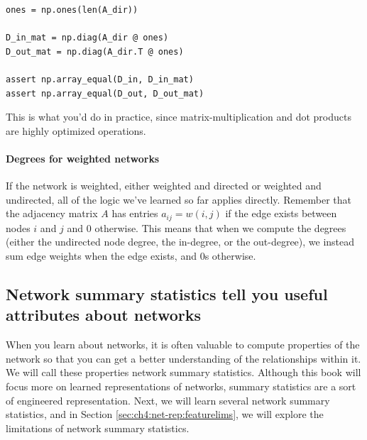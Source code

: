\begin{lstlisting}[style=python]
ones = np.ones(len(A_dir))

D_in_mat = np.diag(A_dir @ ones)
D_out_mat = np.diag(A_dir.T @ ones)

assert np.array_equal(D_in, D_in_mat)
assert np.array_equal(D_out, D_out_mat)
\end{lstlisting}

This is what you'd do in practice, since matrix-multiplication and dot products are highly optimized operations.

\paragraph{Degrees for weighted networks}

If the network is weighted, either weighted and directed or weighted and undirected, all of the logic we've learned so far applies directly. Remember that the adjacency matrix $A$ has entries $a_{ij} = w(i, j)$ if the edge exists between nodes $i$ and $j$ and $0$ otherwise. This means that when we compute the degrees (either the undirected node degree, the in-degree, or the out-degree), we instead sum edge weights when the edge exists, and $0$s otherwise.

\subsection{Network summary statistics tell you useful attributes about networks}

When you learn about networks, it is often valuable to compute properties of the network so that you can get a better understanding of the relationships within it. We will call these properties {network summary statistics}. Although this book will focus more on {learned} representations of networks, summary statistics are a sort of {engineered} representation. Next, we will learn several network summary statistics, and in Section \ref{sec:ch4:net-rep:featurelims}, we will explore the limitations of network summary statistics.


